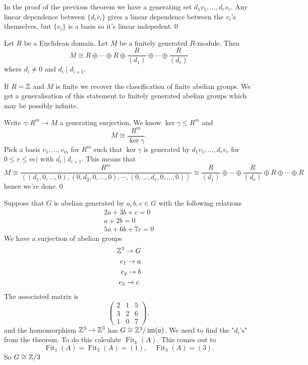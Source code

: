 \documentclass{article}
\DeclareMathOperator{\Fit}{Fit}
\begin{document}
\pf In the proof of the previous theorem we have a generating set $ d_1v_1,\dots, d_rv_r $. Any linear dependence between $ \{d_iv_i\} $ gives a linear dependence between the $ v_i $'s themselves, but $ \{v_i\} $ is a basis so it's linear indepedent.\qed
\begin{theorem}
  Let $ R $ be a Euclidean domain. Let $ M $ be a finitely generated $ R $-module. Then
  \[
	  M\cong R\oplus \cdots \oplus R\oplus \frac R{(d_1)}\oplus \cdots \oplus\frac R{(d_r)}
  \]
  where $ d_i\ne 0 $ and $ d_i\mid d_{i+1} $.
\end{theorem}
\begin{remark}
  If $ R=\mathbb{Z} $ and $ M $ is finite we recover the classification of finite abelian groups. We get a generalisation of this statement to finitely generated abelian groups which may be possibly infinite.
\end{remark}
\pf Write $ \gamma:R^m\to M $ a generating surjection. We know $ \ker \gamma\le R^m $ and
\[
	M\cong \frac{R^m}{\ker \gamma}.
\]
Pick a basis $ v_1,\dots,v_m $ for $ R^m $ such that $ \ker\gamma $ is generated by $ d_1v_1,\dots,d_rv_r $ for $ 0\le r\le m) $ with $ d_i\mid d_{i+1} $. This means that \[
	M\cong\frac{R^m}{\left\langle(d_1,0,\dots,0),(0,d_2,0,\dots,0),\cdots,(0,\dots,d_r,0,\dots,0)\right\rangle}\cong \frac R{(d_1)}\oplus\cdots\oplus \frac R{(d_r)}\oplus R\oplus\cdots\oplus R
\]
hence we're done.\qed
\par
Suppose that $ G $ is abelian generated by $ a,b,c\in G $ with the following relations
\begin{align*}
  2a+3b+c=0 \\
  a+2b=0 \\
  5a+6b+7c=0
\end{align*}
We have a surjection of abelian groups
\begin{align*}
  \mathbb{Z}^3\to G\\
  e_1\to a\\
  e_2\to b\\
  e_3\to c.
\end{align*}
The associated matrix is
\[
  \begin{pmatrix}
	  2 & 1& 5 \\
	  3 & 2 & 6\\
	  1& 0 & 7
  \end{pmatrix},
\]
and the homomorphism $ \mathbb{Z}^3\to \mathbb{Z}^3 $ has $ G\cong \mathbb{Z}^3/\operatorname{im}(a) $. 
We need to find the "$ d_i $'s" from the theorem. To do this calculate $ \Fit_k(A) $. This comes out to
\[
  \Fit_1(A)=\Fit_2(A)=(1),\quad \Fit_3(A)=(3).
\]
So $ G\cong \mathbb{Z}/3 $
\end{document}
